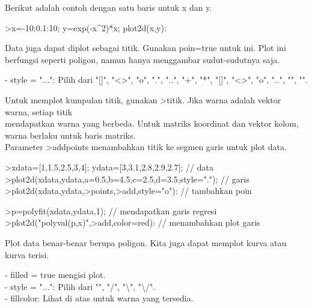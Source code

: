 \documentclass{article}
\begin{document}
\begin{eulernotebook}
\begin{eulercomment}
\begin{eulercomment}
\begin{eulercomment}
\begin{eulercomment}
\begin{eulercomment}
\begin{eulercomment}
\begin{eulercomment}
\begin{eulercomment}
\begin{eulercomment}
Berikut adalah contoh dengan satu baris untuk x dan y.
\end{eulercomment}
\begin{eulerprompt}
>x=-10:0.1:10; y=exp(-x^2)*x; plot2d(x,y):
\end{eulerprompt}
\begin{eulercomment}
Data juga dapat diplot sebagai titik. Gunakan poin=true untuk ini.
Plot ini berfungsi seperti poligon, namun hanya menggambar
sudut-sudutnya saja.

- style = "...": Pilih dari "[]", "\textless{}\textgreater{}", "o", ".", "..", "+", "*",
"[]", "\textless{}\textgreater{}", "o", "..", "", "\textbar{}".

Untuk memplot kumpulan titik, gunakan \textgreater{}titik. Jika warna adalah vektor
warna, setiap titik\\
mendapatkan warna yang berbeda. Untuk matriks koordinat dan vektor
kolom, warna berlaku untuk baris matriks.\\
Parameter \textgreater{}addpoints menambahkan titik ke segmen garis untuk plot
data.
\end{eulercomment}
\begin{eulerprompt}
>xdata=[1,1.5,2.5,3,4]; ydata=[3,3.1,2.8,2.9,2.7]; // data
>plot2d(xdata,ydata,a=0.5,b=4.5,c=2.5,d=3.5,style="."); // garis
>plot2d(xdata,ydata,>points,>add,style="o"): // tambahkan poin
\end{eulerprompt}
\begin{eulerprompt}
>p=polyfit(xdata,ydata,1); // mendapatkan garis regresi
>plot2d("polyval(p,x)",>add,color=red): // menambahkan plot garis
\end{eulerprompt}
\begin{eulercomment}
Plot data benar-benar berupa poligon. Kita juga dapat memplot kurva
atau kurva terisi.

- filled = true mengisi plot.\\
- style = "...": Pilih dari "", "/", "\textbackslash{}", "\textbackslash{}/".\\
- fillcolor: Lihat di atas untuk warna yang tersedia.


\end{eulercomment}
\end{eulercomment}
\end{eulercomment}
\end{eulercomment}
\end{eulercomment}
\end{eulercomment}
\end{eulercomment}
\end{eulercomment}
\end{eulercomment}
\end{eulernotebook}
\end{document}
